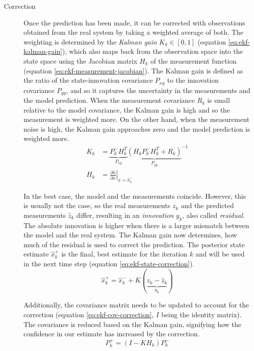 \begin{description}
\item[Correction] Once the prediction has been made, it can be corrected with observations obtained from the real system by taking a weighted average of both. The weighting is determined by the \textit{Kalman gain} $K_k \in [0, 1]$ (equation \ref{eq:ekf-kalman-gain}), which also maps back from the observation space into the state space using the Jacobian matrix $H_k$ of the measurement function (equation \ref{eq:ekf-measurement-jacobian}). The Kalman gain is defined as the ratio of the state-innovation covariance $P_{xy}$ to the innovation covariance $P_{yy}$, and so it captures the uncertainty in the measurements and the model prediction. When the measurement covariance $R_k$ is small relative to the model covariance, the Kalman gain is high and so the measurement is weighted more. On the other hand, when the measurement noise is high, the Kalman gain approaches zero and the model prediction is weighted more.
\begin{align}\label{eq:ekf-kalman-gain}%
K_k &= \underbrace{P_k^- H_k^T}_\textrm{$P_{xy}$} {\underbrace{(H_k P_k^- H_k^T + R_k)}_\textrm{$P_{yy}$}}^{-1} \\%
\label{eq:ekf-measurement-jacobian}%
H_k &= \left. \frac{\partial h}{\partial x} \right|_{x = \hat{x}_{k}^-}%
\end{align}

In the best case, the model and the measurements coincide. However, this is usually not the case, so the real measurements $z_k$ and the predicted measurements $\hat{z}_k$ differ, resulting in an \textit{innovation} $y_k$, also called \textit{residual}. The absolute innovation is higher when there is a larger mismatch between the model and the real system. The Kalman gain now determines, how much of the residual is used to correct the prediction. The posterior state estimate $\hat{x}_k^+$ is the final, best estimate for the iteration $k$ and will be used in the next time step (equation \ref{eq:ekf-state-correction}).
\begin{equation}\label{eq:ekf-state-correction}%
\hat{x}_k^+ = \hat{x}_k^- + K(\underbrace{z_k - \hat{z}_k}_\textrm{$y_k$})%
\end{equation}

Additionally, the covariance matrix needs to be updated to account for the correction (equation \ref{eq:ekf-cov-correction}, $I$ being the identity matrix). The covariance is reduced based on the Kalman gain, signifying how the confidence in our estimate has increased by the correction.
\begin{equation}\label{eq:ekf-cov-correction}%
P_k^+ = (I - K H_k)P_k^-%
\end{equation}
\end{description}


